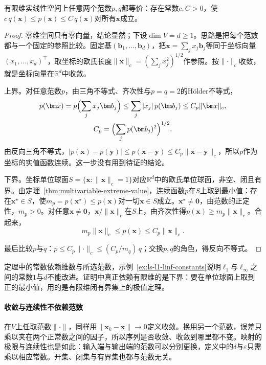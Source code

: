 \begin{theorem}[有限维范数等价]
\label{thm:ls-norm-equivalence}
有限维实线性空间上任意两个范数$p,q$都等价：存在常数$c,C>0$，使$c\,q(\bm x)\leq p(\bm x)\leq C\,q(\bm x)$对所有$\bm x$成立。
\end{theorem}
\begin{proof}
零维空间只有零向量，结论显然；下设$\dim V=d\geq1$。思路是把每个范数都与一个固定的参照比较。固定基$(\bm b_1,\ldots,\bm b_d)$，把$\bm x=\sum_jx_j\bm b_j$等同于坐标向量$(x_1,\ldots,x_d)^\top$，取坐标的欧氏长度$\lVert\bm x\rVert_c=(\sum_jx_j^2)^{1/2}$作参照。按$\lVert\cdot\rVert_c$收敛，就是坐标向量在$\mathbb R^d$中收敛。

上界。对任意范数$p$，由三角不等式、齐次性与$p=q=2$的Hölder不等式，
\[
 \begin{gathered}
 p(\bm x)=p\Bigl(\sum_jx_j\bm b_j\Bigr)\leq\sum_j|x_j|\,p(\bm b_j)\leq C_p\lVert\bm x\rVert_c,\\
 C_p=\Bigl(\sum_jp(\bm b_j)^2\Bigr)^{1/2}.
 \end{gathered}
\]
由反向三角不等式，$|p(\bm x)-p(\bm y)|\leq p(\bm x-\bm y)\leq C_p\lVert\bm x-\bm y\rVert_c$，所以$p$作为坐标的实值函数连续。这一步没有用到待证的结论。

下界。坐标单位球面$S=\{\bm x:\lVert\bm x\rVert_c=1\}$对应$\mathbb R^d$中的欧氏单位球面，非空、闭且有界。由定理~\ref{thm:multivariable-extreme-value}，连续函数$p$在$S$上取到最小值：\label{thm:ls-extreme-value}存在$\bm x^\star\in S$，使$m_p=p(\bm x^\star)\leq p(\bm x)$对一切$\bm x\in S$成立。$\bm x^\star\neq\bm0$，由范数的正定性，$m_p>0$。对任意$\bm x\neq\bm0$，$\bm x/\lVert\bm x\rVert_c$在$S$上，由齐次性得$p(\bm x)\geq m_p\lVert\bm x\rVert_c$。合起来，
\begin{equation}
 m_p\lVert\bm x\rVert_c\leq p(\bm x)\leq C_p\lVert\bm x\rVert_c.
 \label{eq:linear-algebra-finite-norm-equivalence}
\end{equation}

最后比较$p$与$q$：$p\leq C_p\lVert\cdot\rVert_c\leq(C_p/m_q)\,q$；交换$p,q$的角色，得反向不等式。
\end{proof}
定理中的常数依赖维数与所选范数，示例~\ref{ex:ls-l1-linf-constants}说明$\ell_1$与$\ell_\infty$之间的常数$1$与$d$不能改进。证明中真正依赖有限维的是下界：要在单位球面上取到正的最小值，用的是有限维闭有界集上的极值定理。

\paragraph{收敛与连续性不依赖范数}
在$V$上任取范数$\lVert\cdot\rVert$，同样用$\lVert\bm x_k-\bm x\rVert\to0$定义收敛。换用另一个范数，误差只乘以夹在两个正常数之间的因子，所以序列是否收敛、收敛到哪里都不变。映射的极限与连续性也是如此：输入端与输出端的范数可以分别更换，定义中的$\delta$与$\varepsilon$只需乘以相应常数。开集、闭集与有界集也都与范数无关。

